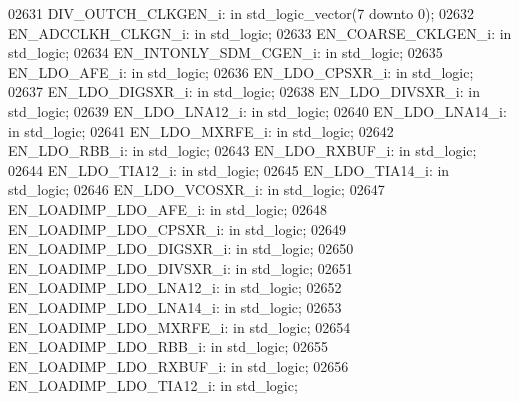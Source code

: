 \begin{DoxyCode}
02631     DIV\_OUTCH\_CLKGEN\_i: \textcolor{keywordflow}{in} \textcolor{comment}{std\_logic\_vector}(\textcolor{vhdllogic}{}\textcolor{vhdllogic}{7} \textcolor{keywordflow}{downto} \textcolor{vhdllogic}{}\textcolor{vhdllogic}{0});
02632     EN\_ADCCLKH\_CLKGN\_i: \textcolor{keywordflow}{in} \textcolor{comment}{std\_logic};
02633     EN\_COARSE\_CKLGEN\_i: \textcolor{keywordflow}{in} \textcolor{comment}{std\_logic};
02634     EN\_INTONLY\_SDM\_CGEN\_i:  \textcolor{keywordflow}{in} \textcolor{comment}{std\_logic};
02635     EN\_LDO\_AFE\_i:   \textcolor{keywordflow}{in} \textcolor{comment}{std\_logic};
02636     EN\_LDO\_CPSXR\_i: \textcolor{keywordflow}{in} \textcolor{comment}{std\_logic};
02637     EN\_LDO\_DIGSXR\_i:    \textcolor{keywordflow}{in} \textcolor{comment}{std\_logic};
02638     EN\_LDO\_DIVSXR\_i:    \textcolor{keywordflow}{in} \textcolor{comment}{std\_logic};
02639     EN\_LDO\_LNA12\_i: \textcolor{keywordflow}{in} \textcolor{comment}{std\_logic};
02640     EN\_LDO\_LNA14\_i: \textcolor{keywordflow}{in} \textcolor{comment}{std\_logic};
02641     EN\_LDO\_MXRFE\_i: \textcolor{keywordflow}{in} \textcolor{comment}{std\_logic};
02642     EN\_LDO\_RBB\_i:   \textcolor{keywordflow}{in} \textcolor{comment}{std\_logic};
02643     EN\_LDO\_RXBUF\_i: \textcolor{keywordflow}{in} \textcolor{comment}{std\_logic};
02644     EN\_LDO\_TIA12\_i: \textcolor{keywordflow}{in} \textcolor{comment}{std\_logic};
02645     EN\_LDO\_TIA14\_i: \textcolor{keywordflow}{in} \textcolor{comment}{std\_logic};
02646     EN\_LDO\_VCOSXR\_i:    \textcolor{keywordflow}{in} \textcolor{comment}{std\_logic};
02647     EN\_LOADIMP\_LDO\_AFE\_i:   \textcolor{keywordflow}{in} \textcolor{comment}{std\_logic};
02648     EN\_LOADIMP\_LDO\_CPSXR\_i: \textcolor{keywordflow}{in} \textcolor{comment}{std\_logic};
02649     EN\_LOADIMP\_LDO\_DIGSXR\_i:    \textcolor{keywordflow}{in} \textcolor{comment}{std\_logic};
02650     EN\_LOADIMP\_LDO\_DIVSXR\_i:    \textcolor{keywordflow}{in} \textcolor{comment}{std\_logic};
02651     EN\_LOADIMP\_LDO\_LNA12\_i: \textcolor{keywordflow}{in} \textcolor{comment}{std\_logic};
02652     EN\_LOADIMP\_LDO\_LNA14\_i: \textcolor{keywordflow}{in} \textcolor{comment}{std\_logic};
02653     EN\_LOADIMP\_LDO\_MXRFE\_i: \textcolor{keywordflow}{in} \textcolor{comment}{std\_logic};
02654     EN\_LOADIMP\_LDO\_RBB\_i:   \textcolor{keywordflow}{in} \textcolor{comment}{std\_logic};
02655     EN\_LOADIMP\_LDO\_RXBUF\_i: \textcolor{keywordflow}{in} \textcolor{comment}{std\_logic};
02656     EN\_LOADIMP\_LDO\_TIA12\_i: \textcolor{keywordflow}{in} \textcolor{comment}{std\_logic};

\end{DoxyCode}
